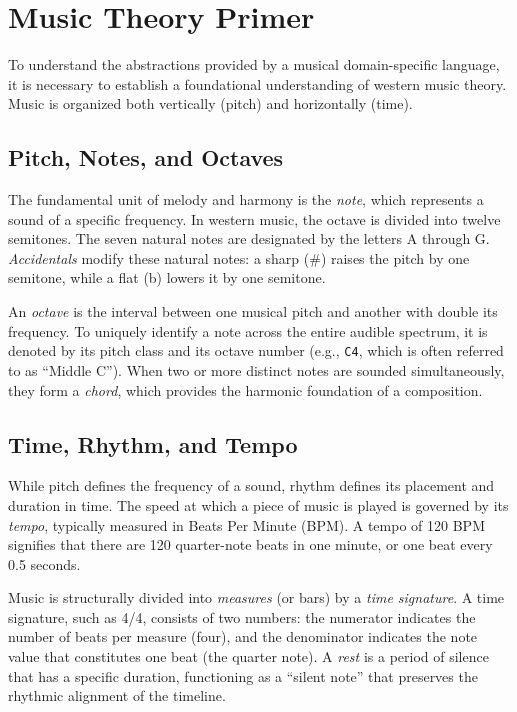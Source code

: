 \section{Music Theory Primer}\label{sec:background-music-theory}

To understand the abstractions provided by a musical domain-specific language, it is necessary to establish a
foundational understanding of western music theory.
Music is organized both vertically (pitch) and horizontally (time).

\subsection{Pitch, Notes, and Octaves}\label{subsec:pitch-notes-and-octaves}

The fundamental unit of melody and harmony is the \textit{note}, which represents a sound of a specific frequency.
In western music, the octave is divided into twelve semitones.
The seven natural notes are designated by the letters A through G\@.
\textit{Accidentals} modify these natural notes: a sharp (\#) raises the pitch by one semitone, while a flat (b) lowers
it by one semitone.

An \textit{octave} is the interval between one musical pitch and another with double its frequency.
To uniquely identify a note across the entire audible spectrum, it is denoted by its pitch class and its octave number
(e.g., \texttt{C4}, which is often referred to as ``Middle C'').
When two or more distinct notes are sounded simultaneously, they form a \textit{chord}, which provides the harmonic
foundation of a composition.

\subsection{Time, Rhythm, and Tempo}\label{subsec:time-rhythm-and-tempo}

While pitch defines the frequency of a sound, rhythm defines its placement and duration in time.
The speed at which a piece of music is played is governed by its \textit{tempo}, typically measured in Beats Per Minute
(BPM).
A tempo of 120 BPM signifies that there are 120 quarter-note beats in one minute, or one beat every 0.5 seconds.

Music is structurally divided into \textit{measures} (or bars) by a \textit{time signature}.
A time signature, such as 4/4, consists of two numbers: the numerator indicates the number of beats per measure (four),
and the denominator indicates the note value that constitutes one beat (the quarter note).
A \textit{rest} is a period of silence that has a specific duration, functioning as a ``silent note'' that preserves the
rhythmic alignment of the timeline.
